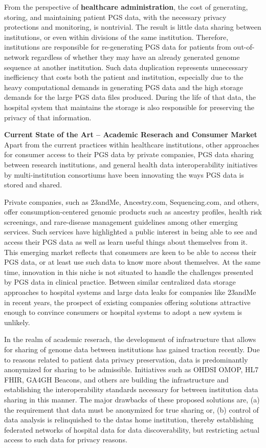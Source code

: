 \documentclass[a4paper,11pt]{article}
\begin{document}
From the perspective of \textbf{healthcare administration}, the cost of generating, storing, and maintaining patient PGS data, with the necessary privacy protections and monitoring, is nontrivial. 
The result is little data sharing between institutions, or even within divisions of the same institution.
Therefore, institutions are responsible for re-generating PGS data for patients from out-of-network regardless of whether they may have an already generated genome sequence at another institution. 
Such data duplication represents unnecessary inefficiency that costs both the patient and institution, especially due to the heavy computational demands in generating PGS data and the high storage demands for the large PGS data files produced. 
During the life of that data, the hospital system that maintains the storage is also responsible for preserving the privacy of that information. 


\textbf{Current State of the Art -- Academic Reserach and Consumer Market}
Apart from the current practices within healthcare institutions, other approaches for consumer access to their PGS data by private companies, PGS data sharing between research institutions, and general health data interoperability initiatives by multi-institution consortiums have been innovating the ways PGS data is stored and shared. 

Private companies, such as 23andMe, Ancestry.com, Sequencing.com, and others, offer consumption-centered genomic products such as ancestry profiles, health risk screenings, and rare-disease management guidelines among other emerging services. 
Such services have highlighted a public interest in being able to see and access their PGS data as well as learn useful things about themselves from it.
This emerging market reflects that consumers are keen to be able to access their PGS data, or at least use such data to know more about themselves. 
At the same time, innovation in this niche is not situated to handle the challenges presented by PGS data in clinical practice. 
Between similar centralized data storage approaches to hospital systems and large data leaks for companies like 23andMe in recent years, the prospect of existing companies offering solutions attractive enough to convince consumers or hospital systems to adopt a new system is unlikely. 

In the realm of academic reserach, the development of infrastructure that allows for sharing of genome data between institutions has gained traction recently. 
Due to reasons related to patient data privacy preservation, data is predominantly anonymized for sharing to be admissible. 
Initiatives such as OHDSI OMOP, HL7 FHIR, GA4GH Beacons, and others are building the infrastructure and establishing the interoperability standards necessary for between institution data sharing in this manner. 
The major drawbacks of these proposed solutions are, (a) the requirement that data must be anonymized for true sharing or, (b) control of data analysis is relinquished to the data\textquotesingle s home institution, thereby establishing federated networks of hospital data for data discoverability, but restricting actual access to such data for privacy reasons.
\end{document}
